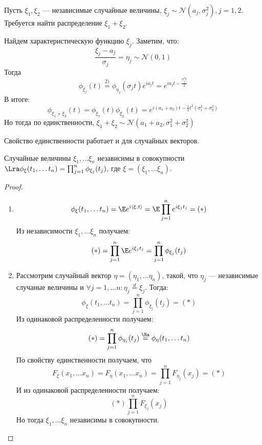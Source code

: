 \begin{example}
    Пусть \(\xi_1, \xi_2\) --- независимые случайные величины, \(\xi_j \sim \mathcal{N}(a_j, \sigma_j^2), j = 1, 2\). Требуется найти распределение \(\xi_1 + \xi_2\).
\end{example}
\begin{solution}
    Найдем характеристическую функцию \(\xi_j\). Заметим, что:
    \[\frac{\xi_j - a_j}{\sigma_j} = \eta_j \sim \mathcal{N}(0, 1)\]
    Тогда
    \[\phi_{\xi_j}(t) \stackrel{2)}{=} \phi_{\eta_j}(\sigma_jt)e^{ia_jt} = e^{ia_jt - \frac{\sigma_j^2t}{2}}\]
    В итоге:
    \[\phi_{\xi_1 + \xi_2}(t) = \phi_{\xi_1}(t)\phi_{\xi_2}(t) = e^{i(a_1 + a_2)t - \frac{1}{2}t^2(\sigma_1^2 + \sigma_2^2)}\]
    Но тогда по единственности, \(\xi_1 + \xi_2 \sim \mathcal{N}(a_1 + a_2, \sigma_1^2 + \sigma_2^2)\)
\end{solution}

\begin{note}
    Свойство единственности работает и для случайных векторов.
\end{note}

\begin{theorem}
    Случайные величины \(\xi_1, \dots \xi_n\) независимы в совокупности \(\Lra \phi_\xi(t_1, \dots t_n) = \prod_{j = 1}^n \phi_{\xi_j}(t_j)\), где \(\xi = (\xi_1, \dots \xi_n)\).
\end{theorem}
\begin{proof}
    \begin{enumerate}
        \item[\(\Ra\)]
        \[\phi_\xi(t_1, \dots t_n) = \E e^{i \langle \xi, t \rangle} = \E\prod_{j = 1}^n e^{i\xi_jt_j} = (*)\]
        Из независимости \(\xi_1, \dots \xi_n\) получаем:
        \[(*) = \prod_{j = 1}^n\E e^{i\xi_j t_j} = \prod_{j = 1}^n \phi_{\xi_j}(t_j)\]
        \item[\(\La\)] Рассмотрим случайный вектор \(\eta = (\eta_1, \dots \eta_n)\), такой, что \(\eta_j\) --- независимые случаные величины и \(\forall j = 1, \dots n: \eta_j \stackrel{d}{=} \xi_j\). Тогда:
        \[\phi_\xi(t_1, \dots t_n) = \prod_{j = 1}^n \phi_{\xi_j}(t_j) = (*)\]
        Из одинаковой распределенности получаем:
        \[(*) = \prod_{j = 1}^n \phi_{\eta_j}(t_j) \stackrel{\Ra}{=}\phi_\eta(t_1, \dots t_n)\]
        По свойству единственности получаем, что
        \[F_\xi(x_1, \dots x_n) = F_\eta(x_1, \dots x_n) = \prod_{j = 1}^n F_{\eta_j}(x_j) = (*)\]
        И из одинаковой распределенности получаем:
        \[(*)\prod_{j = 1}^n F_{\xi_j}(x_j)\]
        Но тогда \(\xi_1, \dots \xi_n\) независимы в совокупности.
    \end{enumerate}
\end{proof}

